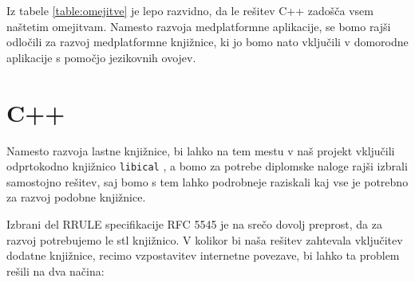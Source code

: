 Iz tabele \ref{table:omejitve} je lepo razvidno, da le rešitev C++ zadošča vsem naštetim omejitvam. Namesto razvoja medplatformne aplikacije, se bomo rajši odločili za razvoj medplatformne knjižnice, ki jo bomo nato vključili v domorodne aplikacije s pomočjo jezikovnih ovojev.

\begin{table}
\footnotesize
{}
\caption{Pregled funkcionalnosti predstavljenih metod.}
\label{table:omejitve}
\end{table}

\section{C++}

Namesto razvoja lastne knjižnice, bi lahko na tem mestu v naš projekt vključili odprtokodno knjižnico \texttt{libical} \cite{libical}, a bomo za potrebe diplomske naloge rajši izbrali samostojno rešitev, saj bomo s tem lahko podrobneje raziskali kaj vse je potrebno za razvoj podobne knjižnice.

Izbrani del RRULE specifikacije RFC 5545 je na srečo dovolj preprost, da za razvoj potrebujemo le \gls{stl} knjižnico. V kolikor bi naša rešitev zahtevala vključitev dodatne knjižnice, recimo vzpostavitev internetne povezave, bi lahko ta problem rešili na dva načina:

